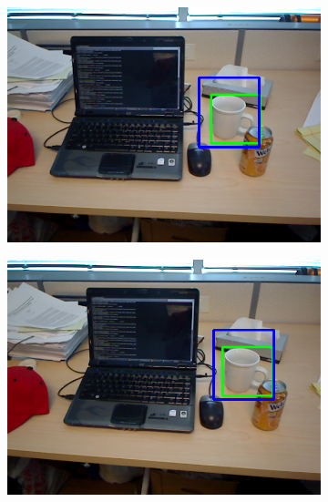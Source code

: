 
\begin{figure}
	\centering
	\begin{subfigure}[b]{0.3\textwidth}
		\includegraphics[width=\textwidth]{img/seguimiento_solo_frame/solo_frame-desk_1-coffee_mug_5-frame_26.png}
	\end{subfigure}
	\begin{subfigure}[b]{0.3\textwidth}
		\includegraphics[width=\textwidth]{img/seguimiento_solo_frame/solo_frame-desk_1-coffee_mug_5-frame_27.png}
	\end{subfigure}
	\begin{subfigure}[b]{0.3\textwidth}

\end{subfigure}
\end{figure}
